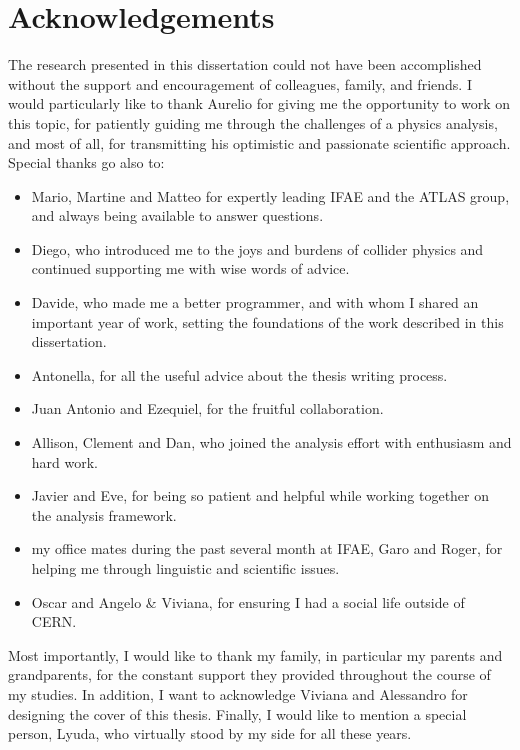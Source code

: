 \chapter*{Acknowledgements}


The research presented in this dissertation could not have been accomplished 
without the support and encouragement of colleagues, family, and friends.
I would particularly like to thank Aurelio for giving me the opportunity to work on 
this topic, for patiently guiding me through the challenges of a physics analysis, 
and most of all, for transmitting his optimistic and passionate scientific approach.
Special thanks go also to:
\begin{itemize}
\item Mario, Martine and Matteo for expertly leading IFAE and the ATLAS group, 
  and always being available to answer questions.
\item Diego, who introduced me to the joys and burdens of collider physics 
  and continued supporting me with wise words of advice.
\item Davide, who made me a better programmer, 
  and with whom I shared an important year of work, 
  setting the foundations of the work described in this dissertation.
\item Antonella, for all the useful advice about the thesis writing process.
\item Juan Antonio and Ezequiel, for the fruitful collaboration.
\item Allison, Clement and Dan, who joined the analysis 
  effort with enthusiasm and hard work.
\item Javier and Eve, for being so patient and helpful 
  while working together on the analysis framework.
\item my office mates during the past several month at IFAE, Garo and Roger,
  for helping me through linguistic and scientific issues.
\item Oscar and Angelo \& Viviana, for ensuring
  I had a social life outside of CERN.
\end{itemize} 

Most importantly, I would like to thank my family, in particular my
parents and grandparents, 
for the constant support they provided throughout the course of my studies.
In addition, I want to acknowledge Viviana and Alessandro for designing the
cover of this thesis.
Finally, I would like to mention a special person, Lyuda, 
who virtually stood by my side for all these years.
